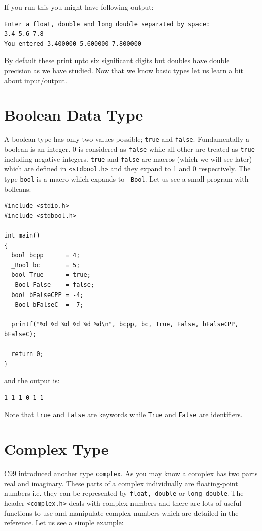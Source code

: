 If you run this you might have following output:

\begin{Verbatim}[frame=single]
Enter a float, double and long double separated by space:
3.4 5.6 7.8
You entered 3.400000 5.600000 7.800000
\end{Verbatim}

By default these print upto six significant digits but doubles have double
precision as we have studied. Now that we know basic types let us learn a bit
about input/output.

\section{Boolean Data Type}
A boolean type has only two values possible; \texttt{true} and
\texttt{false}. Fundamentally a boolean is an integer. 0 is considered as
\texttt{false} while all other are treated as \texttt{true} including negative
integers. \texttt{true} and \texttt{false} are macros (which we will see later)
which are defined in \texttt{<stdbool.h>} and they expand to 1 and 0
respectively. The type \texttt{bool} is a macro which expands to
\texttt{\_Bool}. Let us see a small program with bolleans:

\begin{Verbatim}[frame=single]
#include <stdio.h>
#include <stdbool.h>

int main()
{
  bool bcpp      = 4;
  _Bool bc       = 5;
  bool True      = true;
  _Bool False    = false;
  bool bFalseCPP = -4;
  _Bool bFalseC  = -7;

  printf("%d %d %d %d %d %d\n", bcpp, bc, True, False, bFalseCPP, bFalseC);

  return 0;
}
\end{Verbatim}

and the output is:

\begin{Verbatim}[frame=single]
1 1 1 0 1 1
\end{Verbatim}

Note that \texttt{true} and \texttt{false} are keywords while \texttt{True} and
\texttt{False} are identifiers.

\section{Complex Type}
C99 introduced another type \texttt{complex}. As you may know a complex has two
parts real and imaginary. These parts of a complex individually are
floating-point numbers i.e. they can be represented by \texttt{float, double}
or \texttt{long double}. The header \texttt{<complex.h>} deals with complex
numbers and there are lots of useful functions to use and manipulate complex
numbers which are detailed in the reference. Let us see a simple example:

